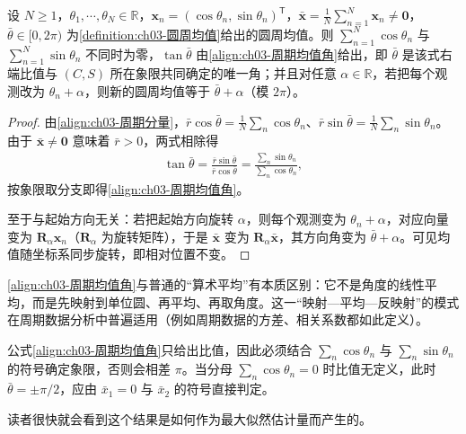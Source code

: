 \documentclass[../../main.tex]{subfiles}
\begin{document}
\begin{proposition}[圆周均值的显式表达]\label{proposition:ch03-圆周均值公式}
设 $N\geqslant1$，$\theta_1,\cdots,\theta_N\in\mathbb{R}$，$\boldsymbol{x}_n=(\cos\theta_n,\sin\theta_n)^{\mathsf{T}}$，$\bar{\boldsymbol{x}}=\frac{1}{N}\sum_{n=1}^{N}\boldsymbol{x}_n\neq\boldsymbol{0}$，$\bar{\theta}\in[0,2\pi)$ 为\cref{definition:ch03-圆周均值}给出的圆周均值。则 $\sum_{n=1}^{N}\cos\theta_n$ 与 $\sum_{n=1}^{N}\sin\theta_n$ 不同时为零，$\tan\bar{\theta}$ 由\eqref{align:ch03-周期均值角}给出，即 $\bar{\theta}$ 是该式右端比值与 $(C,S)$ 所在象限共同确定的唯一角；并且对任意 $\alpha\in\mathbb{R}$，若把每个观测改为 $\theta_n+\alpha$，则新的圆周均值等于 $\bar{\theta}+\alpha$（模 $2\pi$）。
\end{proposition}
\begin{proof}
由\eqref{align:ch03-周期分量}，$\bar{r}\cos\bar{\theta}=\frac1N\sum_n\cos\theta_n$、$\bar{r}\sin\bar{\theta}=\frac1N\sum_n\sin\theta_n$。由于 $\bar{\boldsymbol{x}}\neq\boldsymbol{0}$ 意味着 $\bar{r}>0$，两式相除得
\begin{align*}
\tan\bar{\theta}=\frac{\bar{r}\sin\bar{\theta}}{\bar{r}\cos\bar{\theta}}=\frac{\sum_n\sin\theta_n}{\sum_n\cos\theta_n},
\end{align*}
按象限取分支即得\eqref{align:ch03-周期均值角}。

至于与起始方向无关：若把起始方向旋转 $\alpha$，则每个观测变为 $\theta_n+\alpha$，对应向量变为 $\boldsymbol{R}_\alpha\boldsymbol{x}_n$（$\boldsymbol{R}_\alpha$ 为旋转矩阵），于是 $\bar{\boldsymbol{x}}$ 变为 $\boldsymbol{R}_\alpha\bar{\boldsymbol{x}}$，其方向角变为 $\bar{\theta}+\alpha$。可见均值随坐标系同步旋转，即相对位置不变。
\end{proof}

\begin{remark}
\eqref{align:ch03-周期均值角}与普通的“算术平均”有本质区别：它不是角度的线性平均，而是先映射到单位圆、再平均、再取角度。这一“映射—平均—反映射”的模式在周期数据分析中普遍适用（例如周期数据的方差、相关系数都如此定义）。

公式\eqref{align:ch03-周期均值角}只给出比值，因此必须结合 $\sum_n\cos\theta_n$ 与 $\sum_n\sin\theta_n$ 的符号确定象限，否则会相差 $\pi$。当分母 $\sum_n\cos\theta_n=0$ 时比值无定义，此时 $\bar{\theta}=\pm\pi/2$，应由 $\bar{x}_1=0$ 与 $\bar{x}_2$ 的符号直接判定。
\end{remark}

读者很快就会看到这个结果是如何作为最大似然估计量而产生的。
\end{document}
